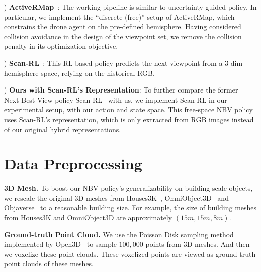     ) \textbf{ActiveRMap}~\citep{zhan2022activermap}: The working pipeline is similar to uncertainty-guided policy. In particular, we implement the ``discrete (free)'' setup of ActiveRMap, which constrains the drone agent on the pre-defined hemisphere. Having considered collision avoidance in the design of the viewpoint set, we remove the collision penalty in its optimization objective.

    ) \textbf{Scan-RL}~\citep{peralta2020next}: This RL-based policy predicts the next viewpoint from a 3-dim hemisphere space, relying on the historical RGB.

    ) \textbf{Ours with Scan-RL's Representation}: To further compare the former Next-Best-View policy Scan-RL~\citep{peralta2020next} with us, we implement Scan-RL in our experimental setup, with our action and state space. This free-space NBV policy uses Scan-RL's representation, which is only extracted from RGB images instead of our original hybrid representations.


\section{Data Preprocessing}
    \noindent \textbf{3D Mesh.}
    To boost our NBV policy's generalizability on building-scale objects, we rescale the original 3D meshes from Houses3K~\citep{houses3k}, OmniObject3D~\citep{wu2023omniobject3d} and Objaverse~\citep{deitke2023objaverse} to a reasonable building size. For example, the size of building meshes from Houses3K and OmniObject3D are approximately $(15m, 15m, 8m)$.

    \noindent \textbf{Ground-truth Point Cloud.}
    We use the Poisson Disk sampling method~\citep{yuksel2015sample} implemented by Open3D~\citep{Zhou2018} to sample $100,000$ points from 3D meshes. And then we voxelize these point clouds. These voxelized points are viewed as ground-truth point clouds of these meshes.


